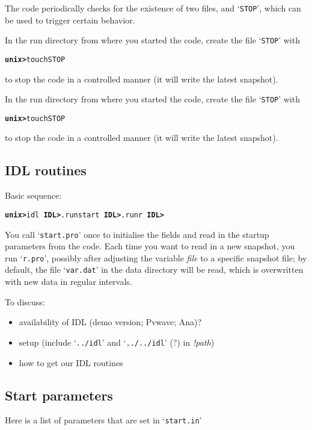 \documentclass[12pt,twoside,notitlepage,a4paper]{article}
\newcommand{\prompt}[1]{{\ttfamily\bfseries{}#1}}
\newcommand{\var}[1]{\textsl{#1}\index{#1}\/}
\newcommand{\file}[1]{`\texttt{#1}'}
\begin{document}
The code periodically checks for the existence of two files, 
and \file{STOP}, which can be used to trigger certain behavior.

In the run directory from where you started the code, create the file
\file{STOP} with
\begin{alltt}
  \prompt{unix> } touch STOP \
\end{alltt}
to stop the code in a controlled manner (it will write the latest
snapshot).

In the run directory from where you started the code, create the file
\file{STOP} with
\begin{alltt}
  \prompt{unix> } touch STOP \
\end{alltt}
to stop the code in a controlled manner (it will write the latest
snapshot).


\subsection{IDL routines}
Basic sequence:
\begin{alltt}
  \prompt{unix> } idl \
  \prompt{IDL> }  .run start \
  \prompt{IDL> }  .run r \
  \prompt{IDL> }  {} \
\end{alltt}
You call \file{start.pro} once to initialise the fields and read in the
startup parameters from the code.
Each time you want to read in a new snapshot, you run \file{r.pro},
possibly after adjusting the variable \var{file} to a specific snapshot
file; by default, the file \file{var.dat} in the data directory will be
read, which is overwritten with new data in regular intervals.

To discuss:
\begin{itemize}
\item availability of IDL (demo version; Pvwave; Ana)?
\item setup (include \file{../idl} and \file{../../idl} (?) in \var{!path})
\item how to get our IDL routines
\end{itemize}



\subsection{Start parameters}
Here is a list of parameters that are set in \file{start.in}
\end{document}

